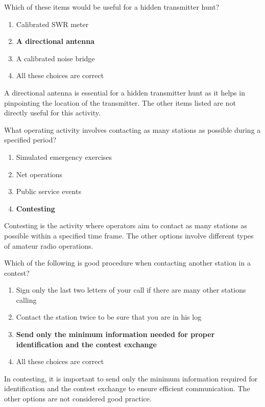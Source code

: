 
\begin{tcolorbox}[colback=gray!10!white,colframe=black!75!black,title={T8C02}]
    Which of these items would be useful for a hidden transmitter hunt?
    \begin{enumerate}[label=\Alph*,noitemsep]
        \item Calibrated SWR meter
        \item \textbf{A directional antenna}
        \item A calibrated noise bridge
        \item All these choices are correct
    \end{enumerate}
\end{tcolorbox}
A directional antenna is essential for a hidden transmitter hunt as it helps in pinpointing the location of the transmitter. The other items listed are not directly useful for this activity.


\begin{tcolorbox}[colback=gray!10!white,colframe=black!75!black,title={T8C03}]
    What operating activity involves contacting as many stations as possible during a specified period?
    \begin{enumerate}[label=\Alph*,noitemsep]
        \item Simulated emergency exercises
        \item Net operations
        \item Public service events
        \item \textbf{Contesting}
    \end{enumerate}
\end{tcolorbox}
Contesting is the activity where operators aim to contact as many stations as possible within a specified time frame. The other options involve different types of amateur radio operations.


\begin{tcolorbox}[colback=gray!10!white,colframe=black!75!black,title={T8C04}]
    Which of the following is good procedure when contacting another station in a contest?
    \begin{enumerate}[label=\Alph*,noitemsep]
        \item Sign only the last two letters of your call if there are many other stations calling
        \item Contact the station twice to be sure that you are in his log
        \item \textbf{Send only the minimum information needed for proper identification and the contest exchange}
        \item All these choices are correct
    \end{enumerate}
\end{tcolorbox}
In contesting, it is important to send only the minimum information required for identification and the contest exchange to ensure efficient communication. The other options are not considered good practice.

